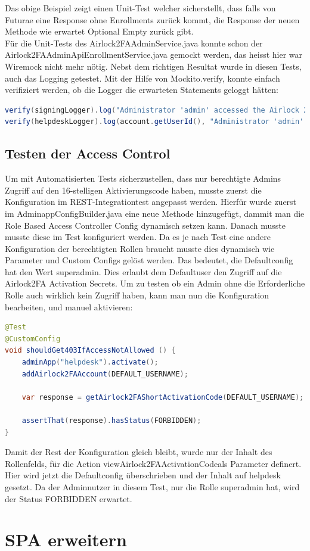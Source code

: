 Das obige Beispiel zeigt einen Unit-Test welcher sicherstellt, dass falls von Futurae eine Response ohne Enrollments zurück kommt, die Response der neuen Methode wie erwartet Optional Empty zurück gibt.\\
Für die Unit-Tests des Airlock2FAAdminService.java konnte schon der\\
Airlock2FAAdminApiEnrollmentService.java gemockt werden, das heisst hier war Wiremock nicht mehr nötig. Nebst dem richtigen Resultat wurde in diesen Tests, auch das Logging getestet. Mit der Hilfe von Mockito.verify, konnte einfach verifiziert werden, ob die Logger die erwarteten Statements geloggt hätten:
\begin{lstlisting}[language=Java]
verify(signingLogger).log("Administrator 'admin' accessed the Airlock 2FA short activation code of user 'user'.");
verify(helpdeskLogger).log(account.getUserId(), "Administrator 'admin' accessed the Airlock 2FA short activation code.");
\end{lstlisting}
\subsection{Testen der Access Control}
Um mit Automatisierten Tests sicherzustellen, dass nur berechtigte Admins Zugriff auf den 16-stelligen Aktivierungscode haben, musste zuerst die Konfiguration im REST-Integrationtest angepasst werden. Hierfür wurde zuerst im AdminappConfigBuilder.java eine neue Methode hinzugefügt, dammit man die Role Based Access Controller Config dynamisch setzen kann. Danach musste musste diese im Test konfiguriert werden. Da es je nach Test eine andere Konfiguration der berechtigten Rollen braucht musste dies dynamisch wie Parameter und Custom Configs gelöst werden. Das bedeutet, die Defaultconfig hat den Wert \flqq superadmin\frqq. Dies erlaubt dem Defaultuser den Zugriff auf die Airlock2FA Activation Secrets. Um zu testen ob ein Admin ohne die Erforderliche Rolle auch wirklich kein Zugriff haben, kann man nun die Konfiguration bearbeiten, und manuel aktivieren:
\begin{lstlisting}[language=Java]
@Test
@CustomConfig
void shouldGet403IfAccessNotAllowed () {
	adminApp("helpdesk").activate();
	addAirlock2FAAccount(DEFAULT_USERNAME);
	
	var response = getAirlock2FAShortActivationCode(DEFAULT_USERNAME);
	
	assertThat(response).hasStatus(FORBIDDEN);
}
\end{lstlisting}
Damit der Rest der Konfiguration gleich bleibt, wurde nur der Inhalt des Rollenfelds, für die Action \flqq viewAirlock2FAActivationCode\frqq als Parameter definert. Hier wird jetzt die Defaultconfig überschrieben und der Inhalt auf helpdesk gesetzt. Da der Adminnutzer in diesem Test, nur die Rolle superadmin hat, wird der Status FORBIDDEN erwartet.
\section{SPA erweitern}















